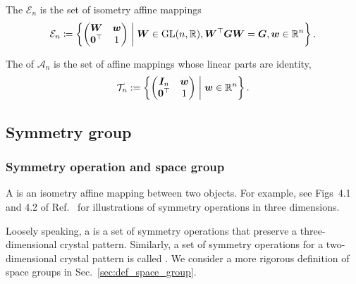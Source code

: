 \begin{screen}
  \begin{defn}
    The  $\mathcal{E}_{n}$ is the set of isometry affine mappings
    \begin{align}
      \mathcal{E}_{n} \coloneqq \left\{  \begin{pmatrix} \bm{W} & \bm{w} \\ \bm{0}^{\top} & 1 \end{pmatrix}  \mathrel{}\middle|\mathrel{}  \bm{W} \in \mathrm{GL}(n, \mathbb{R}), \bm{W}^{\top} \bm{GW} = \bm{G}, \bm{w} \in \mathbb{R}^{n}  \right\}.
    \end{align}
  \end{defn}
\end{screen}

\begin{screen}
  \begin{defn}
    The  of $\mathcal{A}_{n}$ is the set of affine mappings whose linear parts are identity,
    \begin{align}
      \mathcal{T}_{n} := \left\{  \begin{pmatrix} \bm{I}_{n} & \bm{w} \\ \bm{0}^{\top} & 1 \end{pmatrix}  \mathrel{}\middle|\mathrel{}  \bm{w} \in \mathbb{R}^{n}  \right\}.
    \end{align}
  \end{defn}
\end{screen}

\subsection{Symmetry group}

\subsubsection{Symmetry operation and space group}

A  is an isometry affine mapping between two objects.
For example, see Figs~4.1 and 4.2 of Ref.~\cite{muller2013symmetry} for illustrations of symmetry operations in three dimensions.

Loosely speaking, a  is a set of symmetry operations that preserve a three-dimensional crystal pattern.
Similarly, a set of symmetry operations for a two-dimensional crystal pattern is called .
We consider a more rigorous definition of space groups in Sec.~\ref{sec:def_space_group}.

